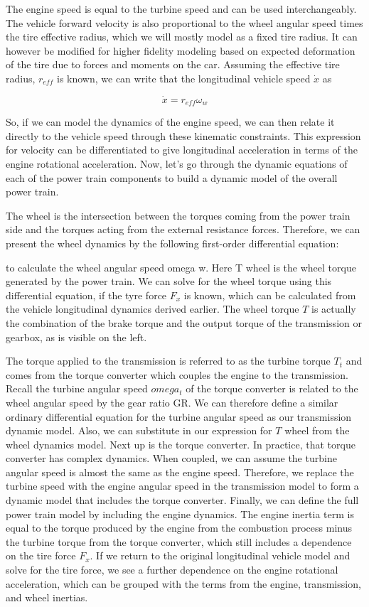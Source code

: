 The engine speed is equal to the turbine speed and can be used interchangeably. The vehicle forward velocity is also proportional to the 
wheel angular speed times the tire effective radius, which we will mostly model as a fixed tire radius. 
It can however be modified for higher fidelity modeling based on expected deformation of the tire due to forces and moments on the car. 
Assuming the effective tire radius, $r_{eff}$ is known, we can write that the longitudinal vehicle speed $\dot{x}$ as

\begin{equation}
\dot{x} = r_{eff}\omega_w
\end{equation}

So, if we can model the dynamics of the engine speed, we can then relate it directly to the vehicle speed through these kinematic constraints. 
This expression for velocity can be differentiated to give longitudinal acceleration in terms of the engine rotational acceleration. 
Now, let's go through the dynamic equations of each of the power train components to build a dynamic model of the overall power train. 

The wheel is the intersection between the torques coming from the power train side
and the torques acting from the external resistance forces. 
Therefore, we can present the wheel dynamics by the following first-order differential equation: 


to calculate the wheel angular speed omega w. Here T wheel is the wheel torque generated by the power train. 
We can solve for the wheel torque using this differential equation, if the tyre force $F_x$ is known, 
which can be calculated from the vehicle longitudinal dynamics derived earlier. 
The wheel torque $T$ is actually the combination of the brake torque and the output torque of the transmission 
or gearbox, as is visible on the left. 

The torque applied to the transmission is referred to as the turbine torque $T_t$ and comes from the 
torque converter which couples the engine to the transmission. 
Recall the turbine angular speed $omega_t$  of the torque converter is related to the wheel angular speed by the gear ratio GR. 
We can therefore define a similar ordinary differential equation for the turbine angular speed as our transmission dynamic model. 
Also, we can substitute in our expression for $T$ wheel from the wheel dynamics model. 
Next up is the torque converter. 
In practice, that torque converter has complex dynamics. 
When coupled, we can assume the turbine angular speed is almost the same as the engine speed. 
Therefore, we replace the turbine speed with the engine angular speed in the transmission model to form a dynamic model that includes the torque converter. 
Finally, we can define the full power train model by including the engine dynamics. 
The engine inertia term is equal to the torque produced by the engine from the combustion process 
minus the turbine torque from the torque converter, which still includes a dependence on the tire force $F_x$. 
If we return to the original longitudinal vehicle model and solve for the tire force, we see a further dependence 
on the engine rotational acceleration, which can be grouped with the terms from the engine, 
transmission, and wheel inertias. 

